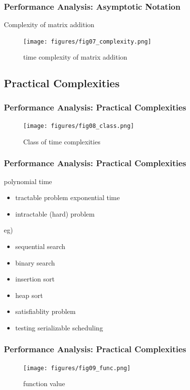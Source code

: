 \documentclass[newPxFont,sthlmFooter,nooffset]{beamer}
\begin{document}
\begin{frame}[t]
  \frametitle{Performance Analysis: Asymptotic Notation}
Complexity of matrix addition
  \begin{figure}[h]
    \centering
    \texttt{[image: figures/fig07\_complexity.png]}
    \caption{time complexity of matrix addition}
  \end{figure}
\end{frame}

\subsection{Practical Complexities}
\begin{frame}[t]
  \frametitle{Performance Analysis: Practical Complexities}

  \begin{figure}[h]
    \centering
    \texttt{[image: figures/fig08\_class.png]}
    \caption{Class of time complexities}
  \end{figure}
\end{frame}


\begin{frame}[t]
  \frametitle{Performance Analysis: Practical Complexities}
polynomial time
\begin{itemize}
\item tractable problem exponential time
\item intractable (hard) problem
\end{itemize}

eg)
\begin{itemize}
\item  sequential search
\item binary search
\item insertion sort
\item heap sort
\item satisfiablity problem
\item testing serializable scheduling
\end{itemize}

\end{frame}



\begin{frame}[t]
  \frametitle{Performance Analysis: Practical Complexities}

  \begin{figure}[h]
    \centering
    \texttt{[image: figures/fig09\_func.png]}
    \caption{function value}
  \end{figure}
\end{frame}
\end{document}
